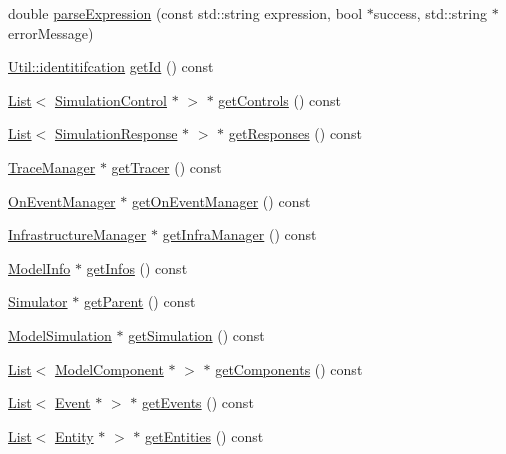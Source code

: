 \begin{DoxyCompactItemize}
double \hyperlink{class_model_a408ddfa761fcd04ec1211ae6c1526ab3}{parse\-Expression} (const std\-::string expression, bool $\ast$success, std\-::string $\ast$error\-Message)
\item 
\hyperlink{class_util_ad17d458d9344b10bba64347e514d6d71}{Util\-::identitifcation} \hyperlink{class_model_abfd7753d30de6abea64b3f0846e097eb}{get\-Id} () const 
\item 
\hyperlink{class_list}{List}$<$ \hyperlink{class_simulation_control}{Simulation\-Control} $\ast$ $>$ $\ast$ \hyperlink{class_model_a20c078a714fe7fba0f02ea1d50a19589}{get\-Controls} () const 
\item 
\hyperlink{class_list}{List}$<$ \hyperlink{class_simulation_response}{Simulation\-Response} $\ast$ $>$ $\ast$ \hyperlink{class_model_ad4caeecd30fd5eb67b46c232cfbea14b}{get\-Responses} () const 
\item 
\hyperlink{class_trace_manager}{Trace\-Manager} $\ast$ \hyperlink{class_model_adc0de22631d77864b7956591c39ebc60}{get\-Tracer} () const 
\item 
\hyperlink{class_on_event_manager}{On\-Event\-Manager} $\ast$ \hyperlink{class_model_afc9de1c6025e8332830b29958ede63a2}{get\-On\-Event\-Manager} () const 
\item 
\hyperlink{class_infrastructure_manager}{Infrastructure\-Manager} $\ast$ \hyperlink{class_model_a944c2b2dffd691d4aafc2d4028c02e6b}{get\-Infra\-Manager} () const 
\item 
\hyperlink{class_model_info}{Model\-Info} $\ast$ \hyperlink{class_model_ac0f1ea5fbbeba7a2992ee13516e7522f}{get\-Infos} () const 
\item 
\hyperlink{class_simulator}{Simulator} $\ast$ \hyperlink{class_model_a69ed4849ae7708a83ace16abb7251b20}{get\-Parent} () const 
\item 
\hyperlink{class_model_simulation}{Model\-Simulation} $\ast$ \hyperlink{class_model_a217487c8193eb6c0afd95a9315cd51bb}{get\-Simulation} () const 
\item 
\hyperlink{class_list}{List}$<$ \hyperlink{class_model_component}{Model\-Component} $\ast$ $>$ $\ast$ \hyperlink{class_model_ae5773d78fc47cb35be7fbeb74b7d63e4}{get\-Components} () const 
\item 
\hyperlink{class_list}{List}$<$ \hyperlink{class_event}{Event} $\ast$ $>$ $\ast$ \hyperlink{class_model_a841c78bda0eb27c652c6921094dc5921}{get\-Events} () const 
\item 
\hyperlink{class_list}{List}$<$ \hyperlink{class_entity}{Entity} $\ast$ $>$ $\ast$ \hyperlink{class_model_ae09e777b481981772818ea3fd2880c4c}{get\-Entities} () const 
\end{DoxyCompactItemize}


